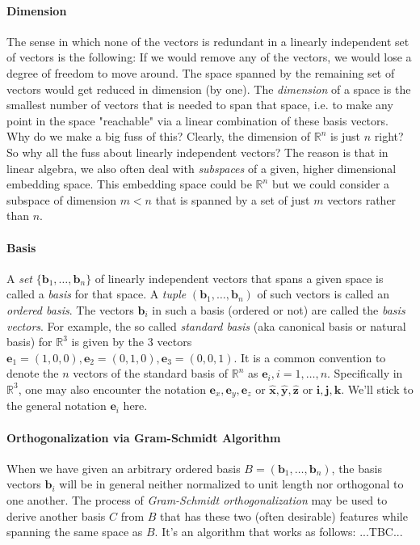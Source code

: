 \paragraph{Dimension}
The sense in which none of the vectors is redundant in a linearly independent set of vectors is the following: If we would remove any of the vectors, we would lose a degree of freedom to move around. The space spanned by the remaining set of vectors would get reduced in dimension (by one). The \emph{dimension} of a space is the smallest number of vectors that is needed to span that space, i.e. to make any point in the space "reachable" via a linear combination of these basis vectors. Why do we make a big fuss of this? Clearly, the dimension of $\mathbb{R}^n$ is just $n$ right? So why all the fuss about linearly independent vectors? The reason is that in linear algebra, we also often deal with \emph{subspaces} of a given, higher dimensional embedding space. This embedding space could be $\mathbb{R}^n$ but we could consider a subspace of dimension $m < n$ that is spanned by a set of just $m$ vectors rather than $n$.


\paragraph{Basis}
A \emph{set} $\{\mathbf{b}_1, \ldots, \mathbf{b}_n \}$ of linearly independent vectors that spans a given space is called a \emph{basis} for that space. A \emph{tuple} $(\mathbf{b}_1, \ldots, \mathbf{b}_n)$ of such vectors is called an \emph{ordered basis}. The vectors $\mathbf{b}_i$ in such a basis (ordered or not) are called the \emph{basis vectors}. For example, the so called \emph{standard basis} (aka canonical basis or natural basis) for $\mathbb{R}^3$ is given by the 3 vectors $\mathbf{e}_1 = (1,0,0), \mathbf{e}_2 = (0,1,0), \mathbf{e}_3 = (0,0,1)$. It is a common convention to denote the $n$ vectors of the standard basis of $\mathbb{R}^n$ as $\mathbf{e}_i, i = 1,\ldots,n$. Specifically in $\mathbb{R}^3$, one may also encounter the notation $\mathbf{e}_x, \mathbf{e}_y, \mathbf{e}_z$ or $\hat{\mathbf{x}}, \hat{\mathbf{y}}, \hat{\mathbf{z}}$ or  $\mathbf{i}, \mathbf{j}, \mathbf{k}$. We'll stick to the general notation $\mathbf{e}_i$ here.


\paragraph{Orthogonalization via Gram-Schmidt Algorithm}
When we have given an arbitrary ordered basis $B = (\mathbf{b}_1, \ldots, \mathbf{b}_n)$, the basis vectors $\mathbf{b}_i$ will be in general neither normalized to unit length nor orthogonal to one another. The process of \emph{Gram-Schmidt orthogonalization} may be used to derive another basis $C$ from $B$ that has these two (often desirable) features while spanning the same space as $B$. It's an algorithm that works as follows: ...TBC...

